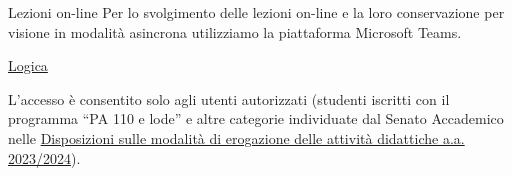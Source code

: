 \documentclass[10pt]{beamer}
\begin{document}
\begin{frame}{Lezioni on-line}
	Per lo svolgimento delle lezioni on-line e la loro conservazione per visione in modalità asincrona utilizziamo la piattaforma Microsoft Teams.

	\bigskip
	\begin{center}

		\medskip
		\href{https://teams.microsoft.com/l/team/19\%3aNsUZdrVfV4D3arWpp18o5tqjomiCdFC4Luead6jlVb41\%40thread.tacv2/conversations?groupId=5cae59bc-99b4-4bbd-b8ae-56c953194b9f&tenantId=41f8b7d0-9a21-415c-9c69-a67984f3d0de}{Logica}
	\end{center}
	\bigskip L'accesso è consentito solo agli utenti autorizzati (studenti iscritti con il programma ``PA 110 e lode'' e altre categorie individuate dal Senato Accademico nelle \href{https://www.unich.it/avvisi/disposizioni-sulle-modalita-di-erogazione-delle-attivita-didattiche-aa-20232024}{Disposizioni sulle modalità di erogazione delle attività didattiche a.a. 2023/2024}).
\end{frame}
\end{document}
